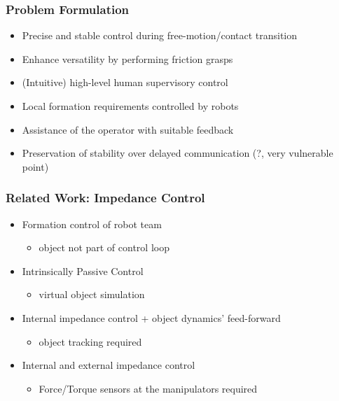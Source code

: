 \documentclass[student]{ITRslides}
\begin{document}
\begin{frame}
	\frametitle{Problem Formulation}

	\begin{itemize}
		\item Precise and stable control during free-motion/contact transition
		\item Enhance versatility by performing friction grasps
		\item (Intuitive) high-level human supervisory control
		\item Local formation requirements controlled by robots
		\item Assistance of the operator with suitable feedback
		\item Preservation of stability over delayed communication (?, very vulnerable point) 
	\end{itemize}

\end{frame}

\begin{frame}
	\frametitle{Related Work: Impedance Control}
	\begin{itemize}
		\item Formation control of robot team \cite{Sieber_15,Wimboeck_06}
		\begin{itemize}
			\item object not part of control loop
		\end{itemize}
		\item Intrinsically Passive Control \cite{Stramigioli_01, Wimboeck_08}
		\begin{itemize}
			\item virtual object simulation
		\end{itemize}
		\item Internal impedance control + object dynamics' feed-forward \cite{DePascali_15}
				\begin{itemize}
			\item object tracking required
		\end{itemize}
		\item Internal and external impedance control \cite{Caccavale_01,Caccavale_08}
			\begin{itemize}
			\item Force/Torque sensors at the manipulators required
			\end{itemize}
	\end{itemize}
\end{frame}
\end{document}
